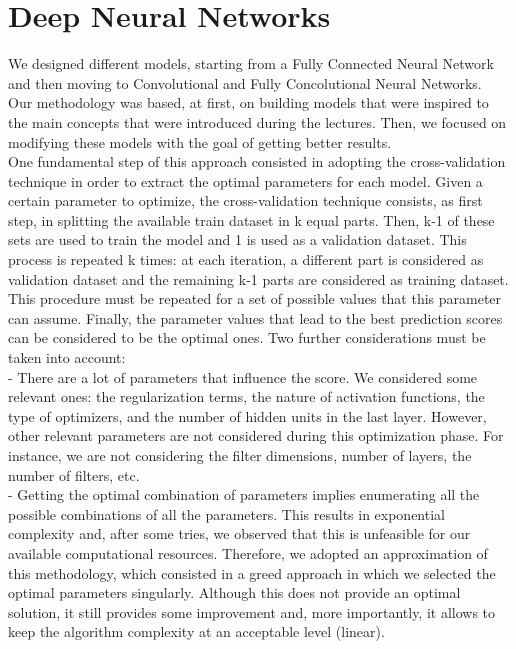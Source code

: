\documentclass[10pt,conference,compsocconf]{IEEEtran}
\begin{document}
\section{Deep Neural Networks}
\label{sec:deep}
We designed different models, starting from a Fully Connected Neural Network and then moving to Convolutional and Fully Concolutional Neural Networks.\\
Our methodology was based, at first, on building models that were inspired to the main concepts that were introduced during the lectures. Then, we focused on modifying these models with the goal of getting better results.\\
One fundamental step of this approach consisted in adopting the cross-validation technique in order to extract the optimal parameters for each model. Given a certain parameter to optimize, the cross-validation technique consists, as first step, in splitting the available train dataset in k equal parts. Then, k-1 of these sets are used to train the model and 1 is used as a validation dataset. This process is repeated k times: at each iteration, a different part is considered as validation dataset and the remaining k-1 parts are considered as training dataset. This procedure must be repeated for a set of possible values that this parameter can assume. Finally, the parameter values that lead to the best prediction scores can be considered to be the optimal ones.
Two further considerations must be taken into account:\\
- There are a lot of parameters that influence the score. We considered some relevant ones: the regularization terms, the nature of activation functions, the type of optimizers, and the number of hidden units in the last layer. However, other relevant parameters are not considered during this optimization phase. For instance, we are not considering the filter dimensions, number of layers, the number of filters, etc. \\
- Getting the optimal combination of parameters implies enumerating all the possible combinations of all the parameters. This results in exponential complexity and, after some tries, we observed that this is unfeasible for our available computational resources. Therefore, we adopted an approximation of this methodology, which consisted in a greed approach in which we selected the optimal parameters singularly. Although this does not provide an optimal solution, it still provides some improvement and, more importantly, it allows to keep the algorithm complexity at an acceptable level (linear). \\
\end{document}
